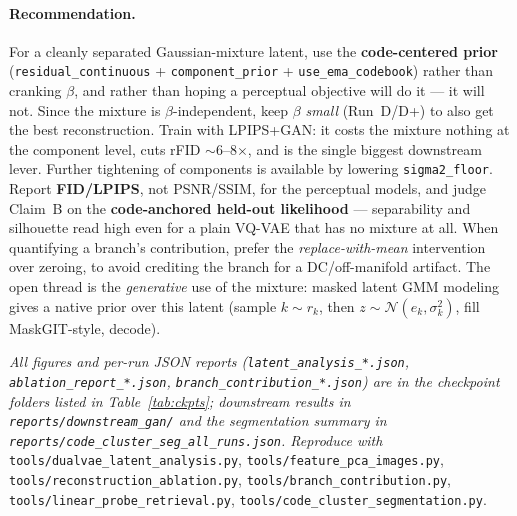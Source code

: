 \documentclass[11pt]{article}
\begin{document}
\paragraph{Recommendation.} For a cleanly separated Gaussian-mixture latent, use the
\textbf{code-centered prior} (\texttt{residual\_continuous} + \texttt{component\_prior} +
\texttt{use\_ema\_codebook}) rather than cranking $\beta$, and rather than hoping a perceptual
objective will do it --- it will not. Since the mixture is $\beta$-independent, keep $\beta$
\emph{small} (Run~D/D+) to also get the best reconstruction. Train with LPIPS+GAN: it costs the
mixture nothing at the component level, cuts rFID $\sim$6--8$\times$, and is the single biggest
downstream lever. Further tightening of components is available by lowering
\texttt{sigma2\_floor}. Report \textbf{FID/LPIPS}, not PSNR/SSIM, for the perceptual models, and
judge Claim~B on the \textbf{code-anchored held-out likelihood} --- separability and silhouette
read high even for a plain VQ-VAE that has no mixture at all. When quantifying a branch's
contribution, prefer the \emph{replace-with-mean} intervention over zeroing, to avoid crediting the
branch for a DC/off-manifold artifact. The open thread is the \emph{generative} use of the mixture:
masked latent GMM modeling gives a native prior over this latent (sample $k\sim r_k$, then
$z\sim\mathcal{N}(e_k,\sigma_k^2)$, fill MaskGIT-style, decode).

\vspace{0.5em}
{\sloppy\small
\noindent\textit{All figures and per-run JSON reports (\texttt{latent\_analysis\_*.json},
\texttt{ablation\_report\_*.json}, \texttt{branch\_contribution\_*.json}) are in the
checkpoint folders listed in Table~\ref{tab:ckpts}; downstream results in
\texttt{reports/downstream\_gan/} and the segmentation summary in
\texttt{reports/code\_cluster\_seg\_all\_runs.json}. Reproduce with}
\texttt{tools/dualvae\_latent\_analysis.py}, \texttt{tools/feature\_pca\_images.py},
\texttt{tools/reconstruction\_ablation.py}, \texttt{tools/branch\_contribution.py},
\texttt{tools/linear\_probe\_retrieval.py}, \texttt{tools/code\_cluster\_segmentation.py}.
}
\end{document}
